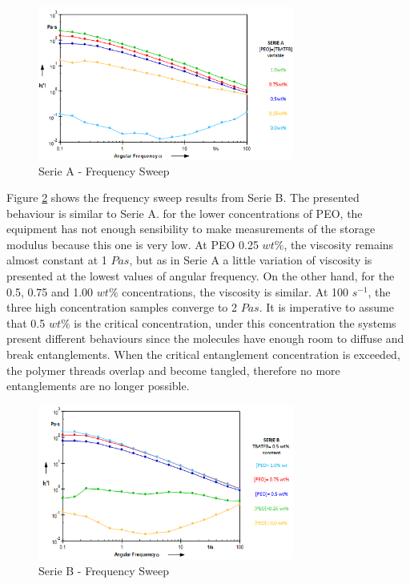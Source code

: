 \begin{figure}[th]
\centering
\includegraphics[width=0.75\textwidth]{./Figures/SerieAfreqSweep.png}
\decoRule
\caption[Serie A - Frequency Sweep]{Serie A - Frequency Sweep}
\label{fig:SerieAfreqSweep}
\end{figure}

Figure \ref{fig:SerieBfreqSweep} shows the frequency sweep results from Serie B. The presented behaviour is similar to Serie A. for the lower concentrations of PEO, the equipment has not enough sensibility to make measurements of the storage modulus because this one is very low. At PEO 0.25 $w t \%$, the viscosity remains almost constant at 1 $Pa s$, but as in Serie A a little variation of viscosity is presented at the lowest values of angular frequency. On the other hand, for the 0.5, 0.75 and 1.00 $w t \%$ concentrations, the viscosity is similar. At 100 $s^{-1}$, the three high concentration samples converge to 2 $Pa s$. It is imperative to assume that 0.5 $w t \%$ is the critical concentration, under this concentration the systems present different behaviours since the molecules have enough room to diffuse and break entanglements. When the critical entanglement concentration is exceeded, the polymer threads overlap and become tangled, therefore no more entanglements are no longer possible.

\begin{figure}[th]
\centering
\includegraphics[width=0.75\textwidth]{./Figures/SerieBfreqSweep.png}
\decoRule
\caption[Serie B - Frequency Sweep]{Serie B - Frequency Sweep}
\label{fig:SerieBfreqSweep}
\end{figure}

